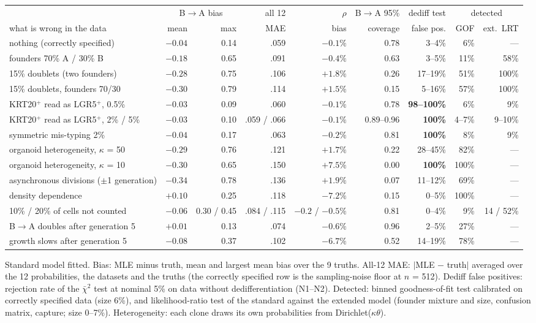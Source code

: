 \documentclass[10pt,a4paper]{article}
\newcommand{\BA}{B$\to$A}
\begin{document}
\begin{center}\scriptsize\setlength{\tabcolsep}{2.4pt}
\begin{tabular}{@{}lrrrrrrrr@{}}\toprule
 & \multicolumn{2}{c}{\BA{} bias} & all 12 & $\rho$ & \BA{} 95\% & dediff test & \multicolumn{2}{c}{detected} \\
what is wrong in the data & mean & max & MAE & bias & coverage & false pos. & GOF & ext.\ LRT \\\midrule
nothing (correctly specified) & $-0.04$ & 0.14 & .059 & $-0.1\%$ & 0.78 & 3--4\% & 6\% & --- \\
founders 70\% A / 30\% B & $-0.18$ & 0.65 & .091 & $-0.4\%$ & 0.63 & 3--5\% & 11\% & 58\% \\
15\% doublets (two founders) & $-0.28$ & 0.75 & .106 & $+1.8\%$ & 0.26 & 17--19\% & 51\% & 100\% \\
15\% doublets, founders 70/30 & $-0.30$ & 0.79 & .114 & $+1.5\%$ & 0.15 & 5--16\% & 57\% & 100\% \\
KRT20$^+$ read as LGR5$^+$, 0.5\% & $-0.03$ & 0.09 & .060 & $-0.1\%$ & 0.78 & \textbf{98--100\%} & 6\% & 9\% \\
KRT20$^+$ read as LGR5$^+$, 2\% / 5\% & $-0.03$ & 0.10 & .059 / .066 & $-0.1\%$ & 0.89--0.96 & \textbf{100\%} & 4--7\% & 9--10\% \\
symmetric mis-typing 2\% & $-0.04$ & 0.17 & .063 & $-0.2\%$ & 0.81 & \textbf{100\%} & 8\% & 9\% \\
organoid heterogeneity, $\kappa$ = 50 & $-0.29$ & 0.76 & .121 & $+1.7\%$ & 0.22 & 28--45\% & 82\% & --- \\
organoid heterogeneity, $\kappa$ = 10 & $-0.30$ & 0.65 & .150 & $+7.5\%$ & 0.00 & \textbf{100\%} & 100\% & --- \\
asynchronous divisions ($\pm$1 generation) & $-0.34$ & 0.78 & .136 & $+1.9\%$ & 0.07 & 11--12\% & 69\% & --- \\
density dependence & $+0.10$ & 0.25 & .118 & $-7.2\%$ & 0.15 & 0--5\% & 100\% & --- \\
10\% / 20\% of cells not counted & $-0.06$ & 0.30 / 0.45 & .084 / .115 & $-0.2$ / $-0.5\%$ & 0.81 & 0--4\% & 9\% & 14 / 52\% \\
\BA{} doubles after generation 5 & $+0.01$ & 0.13 & .074 & $-0.6\%$ & 0.96 & 2--5\% & 27\% & --- \\
growth slows after generation 5 & $-0.08$ & 0.37 & .102 & $-6.7\%$ & 0.52 & 14--19\% & 78\% & --- \\\bottomrule
\end{tabular}

Standard model fitted. Bias: MLE minus truth, mean and largest mean bias over the 9 truths. All-12 MAE: $|$MLE $-$ truth$|$ averaged over the 12 probabilities, the datasets and the truths (the correctly specified row is the sampling-noise floor at $n$ = 512). Dediff false positives: rejection rate of the $\bar\chi^2$ test at nominal 5\% on data without dedifferentiation (N1--N2). Detected: binned goodness-of-fit test calibrated on correctly specified data (size 6\%), and likelihood-ratio test of the standard against the extended model (founder mixture and size, confusion matrix, capture; size 0--7\%). Heterogeneity: each clone draws its own probabilities from Dirichlet($\kappa\theta$).
\end{center}
\end{document}
